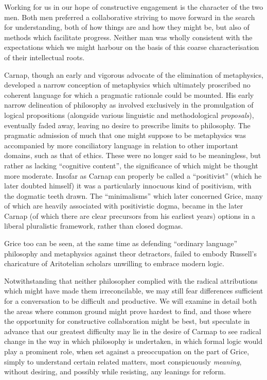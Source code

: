 \documentclass[10pt,titlepage]{book}
\begin{document}
Working for us in our hope of constructive engagement is the character of the two men.
Both men preferred a collaborative striving to move forward in the search for understanding, both of how things are and how they might be, but also of methods which facilitate progress.
Neither man was wholly consistent with the expectations which we might harbour on the basis of this coarse characterisation of their intellectual roots.

Carnap, though an early and vigorous advocate of the elimination of metaphysics, developed a narrow conception of metaphysics which ultimately proscribed no coherent language for which a pragmatic rationale could be mounted.
His early narrow delineation of philosophy as involved exclusively in the promulgation of logical propositions (alongside various linguistic and methodological {\it proposals}), eventually faded away, leaving no desire to prescribe limits to philosophy.
The pragmatic admission of much that one might suppose to be metaphysics was accompanied by more conciliatory language in relation to other important domains, such as that of ethics.
These were no longer said to be meaningless, but rather as lacking ``cognitive content'', the significance of which might be thought more moderate.
Insofar as Carnap can properly be called a ``positivist'' (which he later doubted himself) it was a particularly innocuous kind of positivism, with the dogmatic teeth drawn.
The ``minimalisms'' which later concerned Grice, many of which are heavily associated with positivistic dogma, became in the later Carnap (of which there are clear precursors from his earliest years) options in a liberal pluralistic framework, rather than closed dogmas.

Grice too can be seen, at the same time as defending ``ordinary language'' philosophy and metaphysics against theor detractors, failed to embody Russell's charicature of Aritotelian scholars unwilling to embrace modern logic.

Notwithstanding that neither philosopher complied with the radical attributions which might have made them irreconcilable, we may still fear differences sufficient for a conversation to be difficult and productive.
We will examine in detail both the areas where common ground might prove hardest to find, and those where the opportunity for constructive collaboration might be best, but speculate in advance that our greatest difficulty may lie in the desire of Carmap to see radical change in the way in which philosophy is undertaken, in which formal logic would play a prominent role, when set against a preoccupation on the part of Grice, simply to understand certain related matters, most conspicuously {\it meaning}, without desiring, and possibly while resisting, any leanings for reform.
\end{document}
